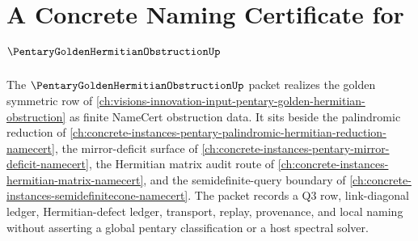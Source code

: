 \chapter{A Concrete Naming Certificate for $\PentaryGoldenHermitianObstructionUp$}
\label{ch:concrete-instances-pentary-golden-hermitian-obstruction-namecert}

The $\PentaryGoldenHermitianObstructionUp$ packet realizes the golden symmetric row of \autoref{ch:visions-innovation-input-pentary-golden-hermitian-obstruction} as finite NameCert obstruction data. It sits beside the palindromic reduction of \autoref{ch:concrete-instances-pentary-palindromic-hermitian-reduction-namecert}, the mirror-deficit surface of \autoref{ch:concrete-instances-pentary-mirror-deficit-namecert}, the Hermitian matrix audit route of \autoref{ch:concrete-instances-hermitian-matrix-namecert}, and the semidefinite-query boundary of \autoref{ch:concrete-instances-semidefinitecone-namecert}. The packet records a Q3 row, link-diagonal ledger, Hermitian-defect ledger, transport, replay, provenance, and local naming without asserting a global pentary classification or a host spectral solver.

